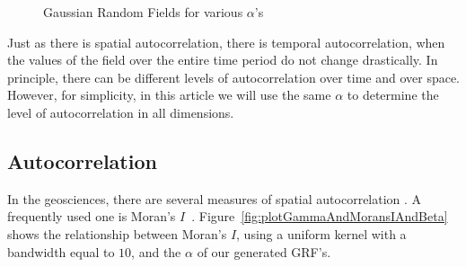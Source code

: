 \documentclass[ijgi,article,submit,moreauthors,pdftex,10pt,a4paper]{Definitions/mdpi}
\begin{document}
\begin{figure}[H]
\hspace{8mm}
\caption{Gaussian Random Fields for various $\alpha$'s}
\label{fig:GaussianRandomField}
\end{figure}

Just as there is spatial autocorrelation, there is temporal autocorrelation, when the values of the field over the entire time period do not change drastically. In principle, there can be different levels of autocorrelation over time and over space. However, for simplicity, in this article we will use the same $\alpha$ to determine the level of autocorrelation in all dimensions.

\subsection{Autocorrelation}
\label{sec:Materials and Methods/Autocorrelation}

In the geosciences, there are several measures of spatial autocorrelation \cite{Eshel2011, Storch1999}. A frequently used one is Moran's $I$~\cite{Moran1950, Hubert1981, PySAL}. Figure~\ref{fig:plotGammaAndMoransIAndBeta} shows the relationship between Moran's $I$, using a uniform kernel with a bandwidth equal to $10$, and the $\alpha$ of our generated GRF's.
\end{document}

